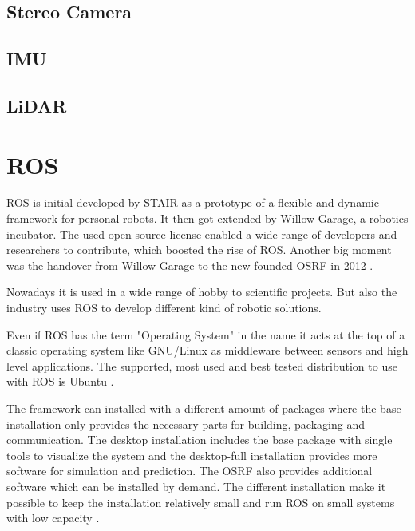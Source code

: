 \subsection{Stereo Camera}\label{ssec:HWstereoCamera}

\subsection{IMU}\label{ssec:HWIMU}

\subsection{LiDAR}\label{ssec:HWLiDAR}

\section{ROS}\label{sec:ros}
\ac{ROS} is initial developed by \ac{STAIR} as a prototype of a flexible and dynamic framework for personal robots.
It then got extended by Willow Garage, a robotics incubator.
The used open-source license enabled a wide range of developers and researchers to contribute, which boosted the rise of \ac{ROS}.
Another big moment was the handover from Willow Garage to the new founded \ac{OSRF} in 2012 \cite{rosHistory}.

Nowadays it is used in a wide range of hobby to scientific projects.
But also the industry uses \ac{ROS} to develop different kind of robotic solutions.

Even if \ac{ROS} has the term "Operating System" in the name it acts at the top of a classic operating system like GNU/Linux as middleware between sensors and high level applications.
The supported, most used and best tested distribution to use with \ac{ROS} is Ubuntu \cite{rosInstallationOS}.

The framework can installed with a different amount of packages where the base installation only provides the necessary parts for building, packaging and communication.
The desktop installation includes the base package with single tools to visualize the system and the desktop-full installation provides more software for simulation and prediction.
The \ac{OSRF} also provides additional software which can be installed by demand.
The different installation make it possible to keep the installation relatively small and run \ac{ROS} on small systems with low capacity \cite{rosInstallations}.

